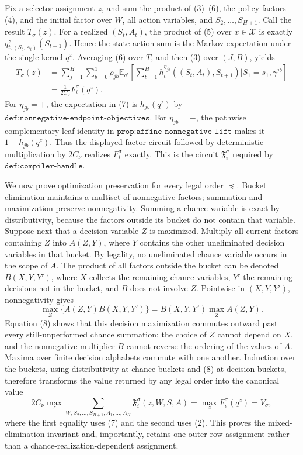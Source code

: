 Fix a selector assignment \(z\), and sum the product of (3)--(6), the policy factors (4), and the initial factor over \(W\), all action variables, and \(S_2,\ldots,S_{H+1}\).  Call the result \(T_\sigma(z)\).  For a realized \((S_t,A_t)\), the product of (5) over \(x\in\mathcal X\) is exactly \(q^z_{t,(S_t,A_t)}(S_{t+1})\).  Hence the state-action sum is the Markov expectation under the single kernel \(q^z\).  Averaging (6) over \(T\), and then (3) over \((J,B)\), yields
\[
 \begin{aligned}
 T_\sigma(z)
 &=\sum_{j=1}^H\sum_{b=0}^1\rho_{jb}
   \mathbb E_{q^z}\!\left[
    \sum_{t=1}^Hh_t^{\eta_{jb}}((S_t,A_t),S_{t+1})
    \mathrel{\big|}S_1=s_1,\gamma^{jb}
   \right]\\
 &= \frac{1}{2C_\nu}F_i^\sigma(q^z).
 \end{aligned}
 \tag{7}
\]
For \(\eta_{jb}=+\), the expectation in (7) is \(h_{jb}(q^z)\) by \(\texttt{def:nonnegative-endpoint-objectives}\).  For \(\eta_{jb}=-\), the pathwise complementary-leaf identity in \(\texttt{prop:affine-nonnegative-lift}\) makes it \(1-h_{jb}(q^z)\).  Thus the displayed factor circuit followed by deterministic multiplication by \(2C_\nu\) realizes \(F_i^\sigma\) exactly.  This is the circuit \(\mathfrak F_i^\sigma\) required by \(\texttt{def:compiler-handle}\).

We now prove optimization preservation for every legal order \(\preceq\).  Bucket elimination maintains a multiset of nonnegative factors; summation and maximization preserve nonnegativity.  Summing a chance variable is exact by distributivity, because the factors outside its bucket do not contain that variable.  Suppose next that a decision variable \(Z\) is maximized.  Multiply all current factors containing \(Z\) into \(A(Z,Y)\), where \(Y\) contains the other uneliminated decision variables in that bucket.  By legality, no uneliminated chance variable occurs in the scope of \(A\).  The product of all factors outside the bucket can be denoted \(B(X,Y,Y')\), where \(X\) collects the remaining chance variables, \(Y'\) the remaining decisions not in the bucket, and \(B\) does not involve \(Z\).  Pointwise in \((X,Y,Y')\), nonnegativity gives
\[
 \max_Z\{A(Z,Y)B(X,Y,Y')\}
 =B(X,Y,Y')\max_ZA(Z,Y).
 \tag{8}
\]
Equation (8) shows that this decision maximization commutes outward past every still-unperformed chance summation: the choice of \(Z\) cannot depend on \(X\), and the nonnegative multiplier \(B\) cannot reverse the ordering of the values of \(A\).  Maxima over finite decision alphabets commute with one another.  Induction over the buckets, using distributivity at chance buckets and (8) at decision buckets, therefore transforms the value returned by any legal order into the canonical value
\[
 2C_\nu\max_z\sum_{W,S_2,\ldots,S_{H+1},A_1,\ldots,A_H}
       \mathfrak F_i^\sigma(z,W,S,A)
 =\max_zF_i^\sigma(q^z)=V_\sigma,
 \tag{9}
\]
where the first equality uses (7) and the second uses (2).  This proves the mixed-elimination invariant and, importantly, retains one outer row assignment rather than a chance-realization-dependent assignment.

